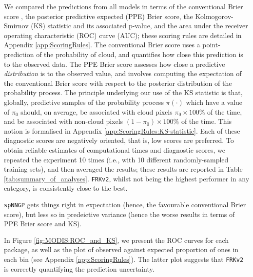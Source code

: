 We compared the predictions from all models in terms of the conventional Brier score \citep[sec.~3]{Gneiting_2007_scoring_rules}, the posterior predictive expected (PPE) Brier score, the Kolmogorov-Smirnov (KS) statistic and its associated p-value, and the area under the receiver operating characteristic (ROC) curve (AUC); these scoring rules are detailed in Appendix \ref{app:ScoringRules}. 
The conventional Brier score uses a point-prediction of the probability of cloud, and quantifies how close this prediction is to the observed data.
The PPE Brier score assesses how close a predictive \textit{distribution} is to the observed value, and involves computing the expectation of the conventional Brier score with respect to the posterior distribution of the probability process.
The principle underlying our use of the KS statistic is that, globally, predictive samples of the probability process $\pi(\cdot)$ which have a value of $\pi_0$ should, on average, be associated with cloud pixels $\pi_0\times 100\%$ of the time, and be associated with non-cloud pixels $(1- \pi_0)\times 100\%$ of the time. This notion is formalised in Appendix \ref{app:ScoringRules:KS-statistic}.
Each of these diagnostic scores are negatively oriented, that is, low scores are preferred. 
To obtain reliable estimates of computational times and diagnostic scores, we repeated the experiment 10 times (i.e., with 10 different randomly-sampled training sets), and then averaged the results; these results are reported in Table \ref{tab:summary_of_analyses}. 
\texttt{FRKv2}, whilst not being the highest performer in any category, is consistently close to the best.

\texttt{spNNGP} gets things right in expectation (hence, the favourable conventional Brier score), but less so in predeictive variance (hence the worse results in terms of PPE Brier score and KS).


In Figure \ref{fig:MODIS:ROC_and_KS}, we present the ROC curves for each package, as well as the plot of observed against expected proportion of ones in each bin (see Appendix \ref{app:ScoringRules}). 
The latter plot suggests that \texttt{FRKv2} is correctly quantifying the prediction uncertainty.

